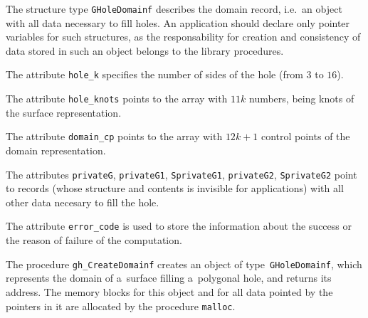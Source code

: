 \vspace{\bigskipamount}
The structure type \texttt{GHoleDomainf} describes the domain record,
i.e.\ an object with all data necessary to fill holes. An application
should declare only pointer variables for such structures, as the
responsability for creation and consistency of data stored in such an
object belongs to the library procedures.

The attribute \texttt{hole\_k} specifies the number of sides of the hole
(from $3$ to $16$).

The attribute \texttt{hole\_knots} points to the array with $11k$ numbers,
being knots of the surface representation.

The attribute \texttt{domain\_cp} points to the array with $12k+1$ control
points of the domain representation.

The attributes \texttt{privateG}, \texttt{privateG1}, \texttt{SprivateG1},
\texttt{privateG2}, \texttt{SprivateG2} point to records (whose structure and
contents is invisible for applications) with all other data necesary to fill
the hole.

The attribute \texttt{error\_code} is used to store the information about
the success or the reason of failure of the computation.


\vspace{\bigskipamount}
The procedure \texttt{gh\_CreateDomainf} creates an object of
type~\texttt{GHoleDomainf}, which represents the domain of a~surface
filling a~polygonal hole, and returns its address. The memory blocks
for this object and for all data pointed by the pointers in it are allocated
by the procedure \texttt{malloc}.

